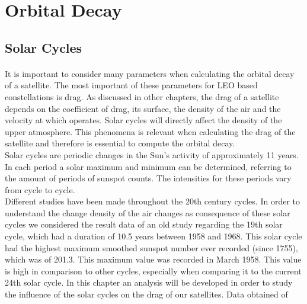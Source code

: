 \documentclass{article}
\begin{document}
\section{Orbital Decay}

\subsection{Solar Cycles}
\paragraph{ }

It is important to consider many parameters when calculating the orbital decay of a satellite. The most important of these parameters for LEO based constellations is drag. As discussed in other chapters, the drag of a satellite depends on the coefficient of drag, its surface, the density of the air and the velocity at which operates. Solar cycles will directly affect the density of the upper atmosphere. This phenomena is relevant when calculating the drag of the satellite and therefore is essential to compute the orbital decay. \\

Solar cycles are periodic changes in the Sun's activity of approximately 11 years. In each period a solar maximum and minimum can be determined, referring to the amount of periods of sunspot counts. The intensities for these periods vary from cycle to cycle. \\



Different studies have been made throughout the 20th century cycles. In order to understand the change  density of the air changes as consequence of these solar cycles we considered the result data of an old study regarding the 19th solar cycle, which had a duration of 10.5 years between 1958 and 1968. This solar cycle had the highest maximum smoothed sunspot number ever recorded (since 1755), which was of 201.3. This maximum value was recorded in March 1958. This value is high in comparison to other cycles, especially when comparing it to the current 24th solar cycle. In this chapter an analysis will be developed in order to study the influence of the solar cycles on the drag of our satellites. Data obtained of \cite{Priester1967}
\end{document}

